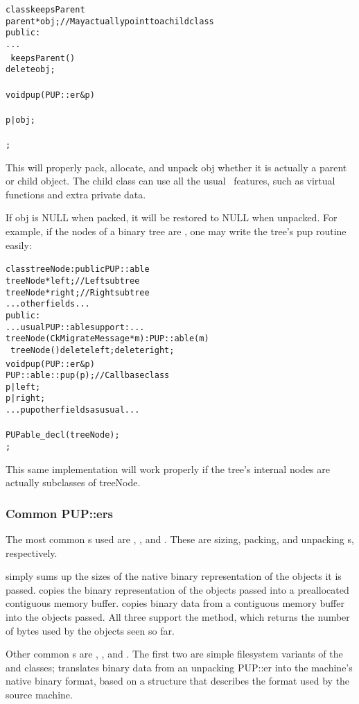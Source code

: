 \begin{alltt}
class keepsParent {
    parent *obj; //May actually point to a child class
public:
    ...
    ~keepsParent() {
        delete obj;
    }
    void pup(PUP::er &p) 
    {
        p|obj;
    }
};
\end{alltt}

This will properly pack, allocate, and unpack obj whether
it is actually a parent or child object.  The child class 
can use all the usual \CC\ features, such as virtual functions
and extra private data.

If obj is NULL when packed, it will be restored to NULL when unpacked.
For example, if the nodes of a binary tree are ,
one may write the tree's pup routine easily:

\begin{alltt}
class treeNode : public PUP::able {
    treeNode *left;//Left subtree
    treeNode *right;//Right subtree
    ... other fields ...
public:
    ... usual PUP::able support: ...
    treeNode(CkMigrateMessage *m) : PUP::able(m) {}
    ~treeNode() {delete left; delete right;}
    void pup(PUP::er &p) {
        PUP::able::pup(p);//Call base class
        p|left;
        p|right;
        ... pup other fields as usual ...
    }
    PUPable\_decl(treeNode);
};
\end{alltt}

This same implementation will work properly if the tree's
internal nodes are actually subclasses of treeNode.


\subsubsection{Common PUP::ers}
The most common s used are ,
, and .  These are sizing,
packing, and unpacking s, respectively.

 simply sums up the sizes of the native
binary representation of the objects it is passed.
 copies the binary representation of the
objects passed into a preallocated contiguous memory buffer.
 copies binary data from a contiguous memory
buffer into the objects passed.  All three support the
 method, which returns the number of bytes used
by the objects seen so far.

Other common s are , 
, and .  The first
two are simple filesystem variants of the  
and  classes;  translates
binary data from an unpacking PUP::er into the machine's
native binary format, based on a  structure
that describes the format used by the source machine.



